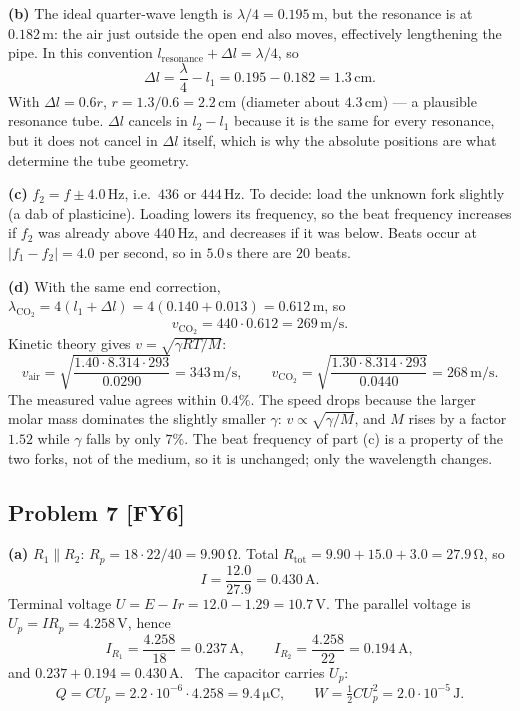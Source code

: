 \documentclass[11pt,a4paper]{article}
\newcommand{\problem}[2]{\subsection*{Problem #1 \; \textnormal{\small[#2]}}}
\newcommand{\unit}[1]{\,\mathrm{#1}}
\begin{document}
\textbf{(b)} The ideal quarter-wave length is $\lambda/4=0.195\unit{m}$, but
the resonance is at $0.182\unit{m}$: the air just outside the open end also
moves, effectively lengthening the pipe. In this convention
$l_{\text{resonance}}+\Delta l=\lambda/4$, so
\[
  \Delta l=\frac{\lambda}{4}-l_1=0.195-0.182=1.3\unit{cm}.
\]
With $\Delta l=0.6r$, $r=1.3/0.6=2.2\unit{cm}$ (diameter about
$4.3\unit{cm}$) --- a plausible resonance tube. $\Delta l$ cancels in
$l_2-l_1$ because it is the same for every resonance, but it does not
cancel in $\Delta l$ itself, which is why the absolute positions are what
determine the tube geometry.

\textbf{(c)} $f_2=f\pm4.0\unit{Hz}$, i.e.\ $436$ or $444\unit{Hz}$.
To decide: load the unknown fork slightly (a dab of plasticine). Loading
lowers its frequency, so the beat frequency increases if $f_2$ was already
above $440\unit{Hz}$, and decreases if it was below. Beats occur at
$|f_1-f_2|=4.0$ per second, so in $5.0\unit{s}$ there are
$\boxed{20}$ beats.

\textbf{(d)} With the same end correction,
$\lambda_{\text{CO}_2}=4(l_1+\Delta l)=4(0.140+0.013)=0.612\unit{m}$, so
\[
  v_{\text{CO}_2}=440\cdot0.612=\boxed{269\unit{m/s}}.
\]
Kinetic theory gives $v=\sqrt{\gamma RT/M}$:
\[
  v_{\text{air}}=\sqrt{\frac{1.40\cdot8.314\cdot293}{0.0290}}
  =343\unit{m/s},\qquad
  v_{\text{CO}_2}=\sqrt{\frac{1.30\cdot8.314\cdot293}{0.0440}}
  =268\unit{m/s}.
\]
The measured value agrees within $0.4\%$. The speed drops because the
larger molar mass dominates the slightly smaller $\gamma$: $v\propto
\sqrt{\gamma/M}$, and $M$ rises by a factor $1.52$ while $\gamma$ falls by
only $7\%$. The beat frequency of part (c) is a property of the two forks,
not of the medium, so it is unchanged; only the wavelength changes.

\problem{7}{FY6}
\textbf{(a)} $R_1\parallel R_2$: $R_p=18\cdot22/40=9.90\unit{\Omega}$.
Total $R_{\text{tot}}=9.90+15.0+3.0=27.9\unit{\Omega}$, so
\[
  I=\frac{12.0}{27.9}=\boxed{0.430\unit{A}}.
\]
Terminal voltage $U=E-Ir=12.0-1.29=\boxed{10.7\unit{V}}$. The parallel
voltage is $U_p=IR_p=4.258\unit{V}$, hence
\[
  I_{R_1}=\frac{4.258}{18}=\boxed{0.237\unit{A}},\qquad
  I_{R_2}=\frac{4.258}{22}=\boxed{0.194\unit{A}},
\]
and $0.237+0.194=0.430\unit{A}$. \checkmark\ The capacitor carries $U_p$:
\[
  Q=CU_p=2.2\cdot10^{-6}\cdot4.258=\boxed{9.4\unit{\mu C}},\qquad
  W=\tfrac12CU_p^2=\boxed{2.0\cdot10^{-5}\unit{J}}.
\]
\end{document}
